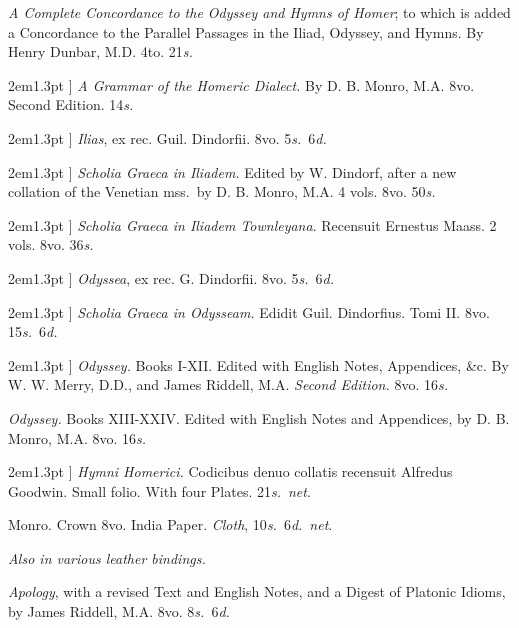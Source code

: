 \documentclass[12pt,oneside]{book}[2021/10/04]
\newcommand{\longdash}{\rule[.5ex]{2em}{1.3pt}
}
\newenvironment{advlist}{
  \begin{description}[leftmargin=1em, parsep=0.2ex, listparindent=1em,]
}{\end{description}}
\newcommand{\¬}{\hphantom{0}}
\begin{document}
\begin{advlist}
\item[Homer.] \textit{A Complete Concordance
to the Odyssey and Hymns of
Homer}; to which is added a Concordance
to the Parallel Passages in
the Iliad, Odyssey, and Hymns.
By Henry Dunbar, M.D. 4to. 21\textit{s.}

\item[\longdash] \textit{A Grammar of the Homeric
Dialect.} By D. B. Monro, M.A.
8vo. Second Edition. 14\textit{s.}

\item[\longdash] \textit{Ilias}, ex rec. Guil. Dindorfii.
8vo. 5\textit{s.}\ 6\textit{d.}

\item[\longdash] \textit{Scholia Graeca in
Iliadem.} Edited by W. Dindorf,
after a new collation of the Venetian
mss.\ by D. B. Monro, M.A. 4 vols.
8vo. 50\textit{s.}

\item[\longdash] \textit{Scholia Graeca in
Iliadem Townleyana}. Recensuit
Ernestus Maass. 2 vols. 8vo. 36\textit{s.}

\item[\longdash] \textit{Odyssea}, ex rec. G.
Dindorfii. 8vo. 5\textit{s.}\ 6\textit{d.}

\item[\longdash] \textit{Scholia Graeca in
Odysseam.} Edidit Guil. Dindorfius.
Tomi II. 8vo. 15\textit{s.}\ 6\textit{d.}

\item[\longdash] \textit{Odyssey.} Books I-XII.
Edited with English Notes, Appendices,
\&c. By W. W. Merry,
D.D., and James Riddell, M.A.
\textit{Second Edition.} 8vo. 16\textit{s.}

\item[Homer.] \textit{Odyssey.} Books XIII-XXIV.
Edited with English Notes
and Appendices, by D. B. Monro,
M.A. 8vo. 16\textit{s.}

\item[\longdash] \textit{Hymni Homerici.} Codicibus
denuo collatis recensuit
Alfredus Goodwin. Small folio.
With four Plates. 21\textit{s.}\ \textit{net}.

\item[Homeri Opera et Reliquiae.]
Monro. Crown 8vo. India Paper.
\textit{Cloth}, 10\textit{s.}\ 6\textit{d.}\ \textit{net}.

\textit{Also in various leather bindings.}

\item[Plato.] \textit{Apology}, with a revised
Text and English Notes, and
a Digest of Platonic Idioms, by
James Riddell, M.A. 8vo. 8\textit{s.}\ 6\textit{d.}


\end{advlist}
\end{document}

